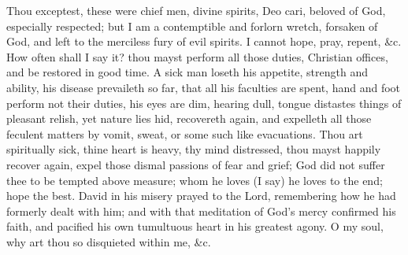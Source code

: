 {Thou exceptest, these were chief men, divine spirits, Deo cari, beloved
of God, especially respected; but I am a contemptible and forlorn
wretch, forsaken of God, and left to the merciless fury of evil
spirits. I cannot hope, pray, repent, \&c. How often shall I say it?
thou mayst perform all those duties, Christian offices, and be restored
in good time. A sick man loseth his appetite, strength and ability, his
disease prevaileth so far, that all his faculties are spent, hand and
foot perform not their duties, his eyes are dim, hearing dull, tongue
distastes things of pleasant relish, yet nature lies hid, recovereth
again, and expelleth all those feculent matters by vomit, sweat, or
some such like evacuations. Thou art spiritually sick, thine heart is
heavy, thy mind distressed, thou mayst happily recover again, expel
those dismal passions of fear and grief; God did not suffer thee to be
tempted above measure; whom he loves (I say) he loves to the end; hope
the best. David in his misery prayed to the Lord, remembering how he
had formerly dealt with him; and with that meditation of God's mercy
confirmed his faith, and pacified his own tumultuous heart in his
greatest agony. O my soul, why art thou so disquieted within me, \&c.

}
